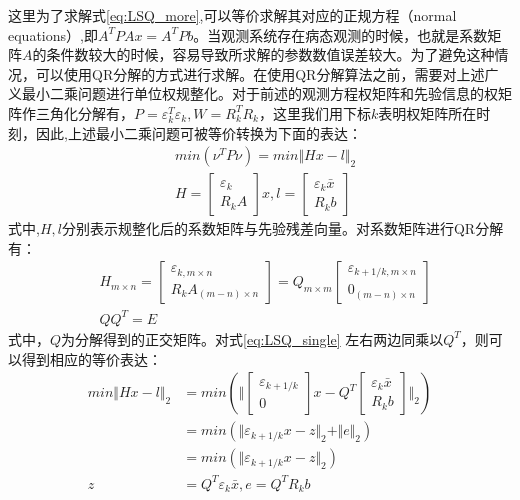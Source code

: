 这里为了求解式\eqref{eq:LSQ_more},可以等价求解其对应的正规方程（normal equations）,即\(A^{T}PAx=A^{T}Pb\)。当观测系统存在病态观测的时候，也就是系数矩阵\(A\)的条件数较大的时候，容易导致所求解的参数数值误差较大。为了避免这种情况，可以使用QR分解的方式进行求解。在使用QR分解算法之前，需要对上述广义最小二乘问题进行单位权规整化。对于前述的观测方程权矩阵和先验信息的权矩阵作三角化分解有，\(P=\varepsilon_{k}^{T}\varepsilon_{k},W=R_{k}^TR_{k}\)，这里我们用下标\(k\)表明权矩阵所在时刻，因此,上述最小二乘问题可被等价转换为下面的表达：
\begin{equation}
	\begin{aligned}
	& min(\nu^{T}P\nu) =min \Vert Hx-l \Vert_{2} \\
	& H = 
	\begin{bmatrix}
		\varepsilon_{k}\\
		R_{k}A 
	\end{bmatrix}x ,
	l = 
	\begin{bmatrix}
		\varepsilon_{k}\bar{x} \\
		R_{k}b 
	\end{bmatrix}
	\end{aligned}
	\label{eq:LSQ_single}	
\end{equation}
式中,\(H,l\)分别表示规整化后的系数矩阵与先验残差向量。对系数矩阵进行QR分解有：
\begin{equation}
	\begin{aligned}
		& H_{m \times n}=
		\begin{bmatrix}
		\varepsilon_{k,m \times n}\\
		R_{k}A_{(m-n) \times n }
		\end{bmatrix} = 
		Q_{m \times m}
		\begin{bmatrix}
		\varepsilon_{k+1/k,m \times n}\\
		0_{(m-n) \times n}
		\end{bmatrix} \\ 
		& QQ^{T}=E
	\end{aligned}
	\label{eq:QR_factor}
\end{equation}
式中，\(Q\)为分解得到的正交矩阵。对式\eqref{eq:LSQ_single} 左右两边同乘以\(Q^{T}\)，则可以得到相应的等价表达：
\begin{equation}
	\begin{aligned}
		min \Vert Hx-l \Vert_{2} & = min(\Vert
		\begin{bmatrix}
			\varepsilon_{k+1/k} \\
			0
		\end{bmatrix} x-Q^{T}
		\begin{bmatrix}
			\varepsilon_{k}\bar{x} \\
			R_{k}b 
		\end{bmatrix}
		 \Vert _{2})\\
		& = min(\Vert \varepsilon_{k+1/k}x - z \Vert_{2} +
			\Vert e \Vert_{2}
		)\\		
		& = min(\Vert \varepsilon_{k+1/k}x - z \Vert_{2}) \\
		z & = Q^{T}\varepsilon_{k}\bar{x},
		e= Q^{T}R_{k}b
	\end{aligned} 
\end{equation}
